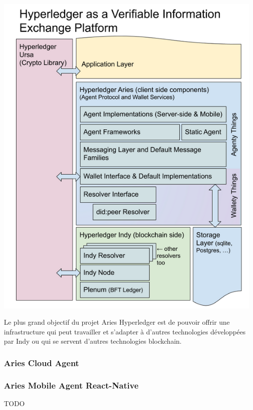 \documentclass[12pt, openany]{report}
\begin{document}
\begin{flushleft}
\includegraphics[scale=0.4]{aries-hyper.png}

Le plus grand objectif du projet Aries Hyperledger est de pouvoir offrir une infrastructure qui peut travailler et s'adapter à d'autres technologies développées par Indy ou qui se servent d'autres technologies blockchain. 

\end{flushleft}

\subsubsection{Aries Cloud Agent}
\noindent 
\begin{flushleft}

\end{flushleft}

\subsubsection{Aries Mobile Agent React-Native}
\noindent 
\begin{flushleft}
TODO
\end{flushleft}
\end{document}
